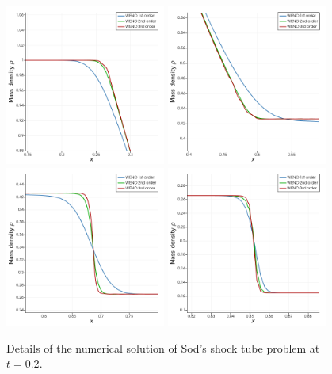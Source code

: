 \begin{figure}[p]
\centering
{} {
	\includegraphics[width=0.47\textwidth]{sod2.png}
} \hfill
{} {
	\includegraphics[width=0.47\textwidth]{sod3.png}
} \\[2em]
 {
	\includegraphics[width=0.47\textwidth]{sod4.png}
} \hfill
{} {
	\includegraphics[width=0.47\textwidth]{sod5.png}
}
\caption{Details of the numerical solution of Sod's shock tube problem at $t = 0.2$.}
\label{fig:sod-closeup}
\end{figure}

